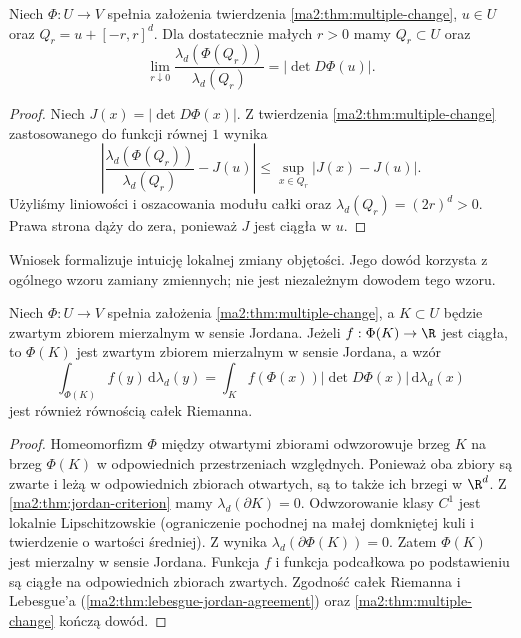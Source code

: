\begin{wniosek}
\label{ma2:cor:multiple-local-volume}
Niech $\Phi:U\to V$ spełnia założenia
twierdzenia \ref{ma2:thm:multiple-change},
$u\in U$ oraz $Q_r=u+[-r,r]^d$.
Dla dostatecznie małych $r>0$ mamy
$Q_r\subset U$ oraz
\[
 \lim_{r\downarrow0}
 \frac{\lambda_d(\Phi(Q_r))}{\lambda_d(Q_r)}
 =|\det D\Phi(u)|.
\]
\end{wniosek}
\begin{proof}
Niech $J(x)=|\det D\Phi(x)|$.
Z twierdzenia \ref{ma2:thm:multiple-change}
zastosowanego do funkcji równej $1$
wynika
\[
 \left|
 \frac{\lambda_d(\Phi(Q_r))}{\lambda_d(Q_r)}
 -J(u)\right|
 \le\sup_{x\in Q_r}|J(x)-J(u)|.
\]
Użyliśmy liniowości i oszacowania modułu
całki oraz $\lambda_d(Q_r)=(2r)^d>0$.
Prawa strona dąży do zera, ponieważ
$J$ jest ciągła w $u$.
\end{proof}

Wniosek formalizuje intuicję lokalnej
zmiany objętości. Jego dowód korzysta
z ogólnego wzoru zamiany zmiennych;
nie jest niezależnym dowodem tego wzoru.

\begin{wniosek}
\label{ma2:cor:multiple-riemann-change}
Niech $\Phi:U\to V$ spełnia założenia
\ref{ma2:thm:multiple-change}, a $K\subset U$
będzie zwartym zbiorem mierzalnym w sensie Jordana.
Jeżeli $f:\Phi(K)\to\R$ jest ciągła, to
$\Phi(K)$ jest zwartym zbiorem mierzalnym
w sensie Jordana, a wzór
\[
 \int_{\Phi(K)} f(y)\,\mathrm d\lambda_d(y)
 =\int_K f(\Phi(x))|\det D\Phi(x)|\,
 \mathrm d\lambda_d(x)
\]
jest również równością całek Riemanna.
\end{wniosek}
\begin{proof}
Homeomorfizm $\Phi$ między otwartymi zbiorami
odwzorowuje brzeg $K$ na brzeg $\Phi(K)$
w odpowiednich przestrzeniach względnych.
Ponieważ oba zbiory są zwarte i leżą
w odpowiednich zbiorach otwartych, są to
także ich brzegi w $\R^d$.
Z \ref{ma2:thm:jordan-criterion}
mamy $\lambda_d(\partial K)=0$.
Odwzorowanie klasy $C^1$ jest lokalnie
Lipschitzowskie (ograniczenie pochodnej
na małej domkniętej kuli i twierdzenie
o wartości średniej). Z
wynika $\lambda_d(\partial\Phi(K))=0$.
Zatem $\Phi(K)$ jest mierzalny w sensie Jordana.
Funkcja $f$ i funkcja podcałkowa po podstawieniu
są ciągłe na odpowiednich zbiorach zwartych.
Zgodność całek Riemanna i Lebesgue'a
(\ref{ma2:thm:lebesgue-jordan-agreement})
oraz \ref{ma2:thm:multiple-change} kończą dowód.
\end{proof}

